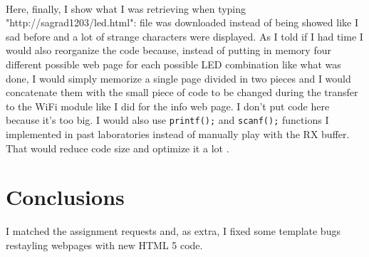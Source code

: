\documentclass[peerreview]{IEEEtran}
\begin{document}
\\Here, finally, I show what I was retrieving when typing "http://sagrad1203/led.html": file was downloaded instead of being showed like I sad before and a lot of strange characters were displayed.
As I told if I had time I would also reorganize the code because, instead of putting in memory four different possible web page for each possible LED combination like what was done, I would simply memorize a single page divided in two pieces and I would concatenate them with the small piece of code to be changed during the transfer to the WiFi module like I did for the info web page. I don't put code here because it's too big. I would also use \lstinline[style=CStyle]{printf();} and \lstinline[style=CStyle]{scanf();} functions I implemented in past laboratories instead of manually play with the RX buffer. That would reduce code size and optimize it a lot .
\label{tab:template}

\section{Conclusions}
I matched the assignment requests and, as extra, I fixed some template bugs restayling webpages with new HTML 5 code.
\end{document}
